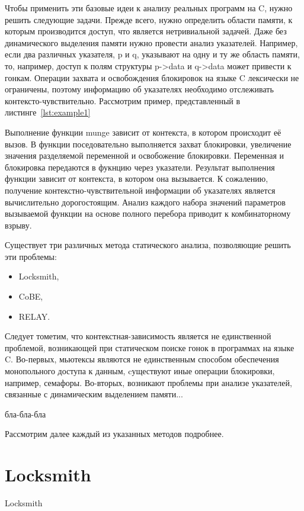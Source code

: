 Чтобы применить эти базовые идеи к анализу реальных программ на C, нужно решить следующие задачи. Прежде всего, нужно определить области памяти, к которым производится доступ, что является нетривиальной задачей. Даже без динамического выделения памяти нужно провести анализ указателей. Например, если два различных указателя, p и q, указывают на одну и ту же область памяти, то, например, доступ к полям структуры p->data и q->data может привести к гонкам. Операции захвата и освобождения блокировок на языке C лексически не ограничены, поэтому информацию об указателях необходимо отслеживать контексто-чувствительно. Рассмотрим пример, представленный в листинге~\ref{lst:example1} 



Выполнение функции munge зависит от контекста, в котором происходит её вызов. В функции поседовательно выполняется захват блокировки, увеличение значения разделяемой переменной и освобожение блокировки. Переменная и блокировка передаются в фукнцию через указатели. Результат выполнения функции зависит от контекста, в котором она вызывается. К сожалению, получение контекстно-чувствительной информации об указателях является вычислительно дорогостоящим. Анализ каждого набора значений параметров вызываемой функции на основе полного перебора приводит к комбинаторному взрыву.

Существует три различных метода статического анализа, позволяющие решить эти проблемы:
\begin{itemize}
\item Locksmith,
\item CoBE,
\item RELAY.
\end{itemize}

Следует тометим, что контекстная-зависимость является не единственной проблемой, возникающей при статическом поиске гонок в программах на языке C. Во-первых, мьютексы являются не единственным способом обеспечения монопольного доступа к данным, cуществуют иные операции блокировки, например, семафоры. Во-вторых, возникают проблемы при анализе указателей, связанные с динамическим выделением памяти...

бла-бла-бла

Рассмотрим далее каждый из указанных методов подробнее.

\section{Locksmith}
Locksmith

